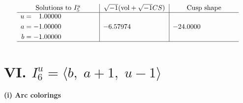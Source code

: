 \documentclass[1p]{elsarticle_modified}
\theoremstyle{definition}
\newcommand{\I}{\sqrt{-1}}
\begin{document}
$$\begin{array}{c|c|c}  
\text{Solutions to }I^u_{5}& \I (\text{vol} + \sqrt{-1}CS) & \text{Cusp shape}\\
 \hline 
\begin{aligned}
u &= \phantom{-}1.00000\phantom{ +0.000000I} \\
a &= -1.00000\phantom{ +0.000000I} \\
b &= -1.00000\phantom{ +0.000000I}\end{aligned}
 & -6.57974\phantom{ +0.000000I} & -24.0000\phantom{ +0.000000I}\\
 \hline 
 \end{array}$$\newpage\newpage\renewcommand{\arraystretch}{1}
\centering \section*{VI. $I^u_{6}= \langle b,\;a+1,\;u-1 \rangle$}
\flushleft \textbf{(i) Arc colorings}\\
\end{document}
